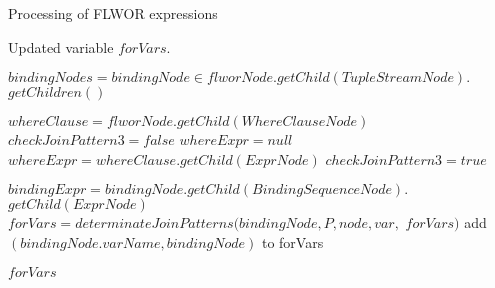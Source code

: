 \begin{algorithm}
\caption{Processing of FLWOR expressions}
\label{ALG_processing_of_flwor_expressions}
\begin{algorithmic}[1]

\ENSURE Updated variable $forVars$.

\STATE $bindingNodes = bindingNode \in flworNode.getChild(TupleStreamNode).$ $getChildren()$

\STATE $whereClause = flworNode.getChild(WhereClauseNode)$
\STATE $checkJoinPattern3 = false$
\STATE $whereExpr = null$
    \STATE $whereExpr = whereClause.getChild(ExprNode)$
        \STATE $checkJoinPattern3 = true$
    \ENDIF
\ENDIF

    \STATE $bindingExpr = bindingNode.getChild(BindingSequenceNode).$ $getChild(ExprNode)$
            \STATE $forVars = determinateJoinPatterns(bindingNode, P, node, var,$ $forVars)$
        \ENDFOR
            \STATE add $(bindingNode.varName, bindingNode)$ to forVars
        \ENDIF
    \ENDIF
\ENDFOR

\RETURN $forVars$
\end{algorithmic}
\end{algorithm}


